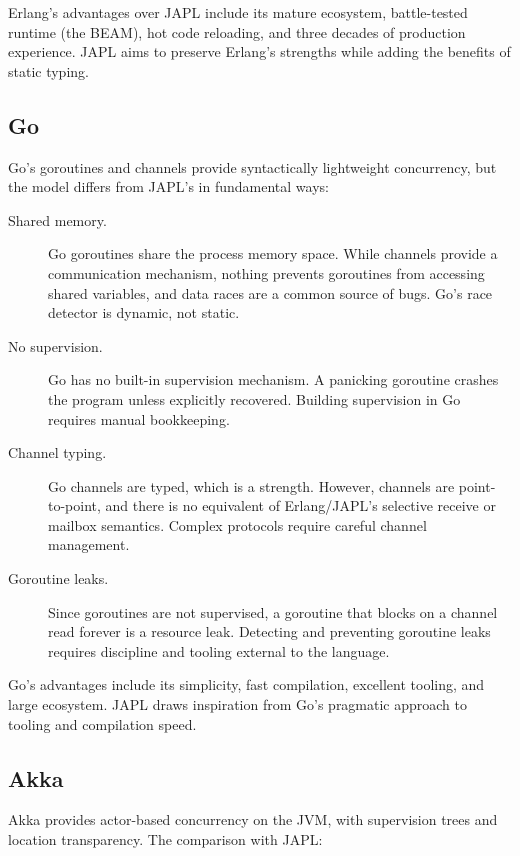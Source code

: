 \documentclass[11pt,a4paper]{article}
\begin{document}
Erlang's advantages over JAPL include its mature ecosystem, battle-tested runtime (the BEAM), hot code reloading, and three decades of production experience. JAPL aims to preserve Erlang's strengths while adding the benefits of static typing.

\subsection{Go}

Go's goroutines and channels provide syntactically lightweight concurrency, but the model differs from JAPL's in fundamental ways:

\begin{description}
\item[Shared memory.] Go goroutines share the process memory space. While channels provide a communication mechanism, nothing prevents goroutines from accessing shared variables, and data races are a common source of bugs. Go's race detector is dynamic, not static.

\item[No supervision.] Go has no built-in supervision mechanism. A panicking goroutine crashes the program unless explicitly recovered. Building supervision in Go requires manual bookkeeping.

\item[Channel typing.] Go channels are typed, which is a strength. However, channels are point-to-point, and there is no equivalent of Erlang/JAPL's selective receive or mailbox semantics. Complex protocols require careful channel management.

\item[Goroutine leaks.] Since goroutines are not supervised, a goroutine that blocks on a channel read forever is a resource leak. Detecting and preventing goroutine leaks requires discipline and tooling external to the language.
\end{description}

Go's advantages include its simplicity, fast compilation, excellent tooling, and large ecosystem. JAPL draws inspiration from Go's pragmatic approach to tooling and compilation speed.

\subsection{Akka}

Akka provides actor-based concurrency on the JVM, with supervision trees and location transparency. The comparison with JAPL:
\end{document}
